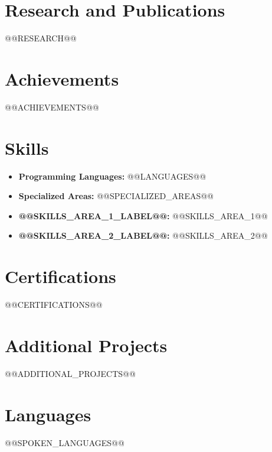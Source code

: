 \documentclass[a4paper,10pt]{article}
\begin{document}
\section*{Research and Publications}
\begin{itemize}
@@RESEARCH@@
\end{itemize}

\section*{Achievements}
\begin{itemize}
@@ACHIEVEMENTS@@
\end{itemize}

\section*{Skills}
\begin{itemize}
  \item \textbf{Programming Languages:} @@LANGUAGES@@
  \item \textbf{Specialized Areas:} @@SPECIALIZED_AREAS@@
  \item \textbf{@@SKILLS_AREA_1_LABEL@@:} @@SKILLS_AREA_1@@
  \item \textbf{@@SKILLS_AREA_2_LABEL@@:} @@SKILLS_AREA_2@@
\end{itemize}

\section*{Certifications}
\begin{itemize}
@@CERTIFICATIONS@@
\end{itemize}

\section*{Additional Projects}
\begin{itemize}
@@ADDITIONAL_PROJECTS@@
\end{itemize}

\section*{Languages}
\begin{itemize}
@@SPOKEN_LANGUAGES@@
\end{itemize}
\end{document}

